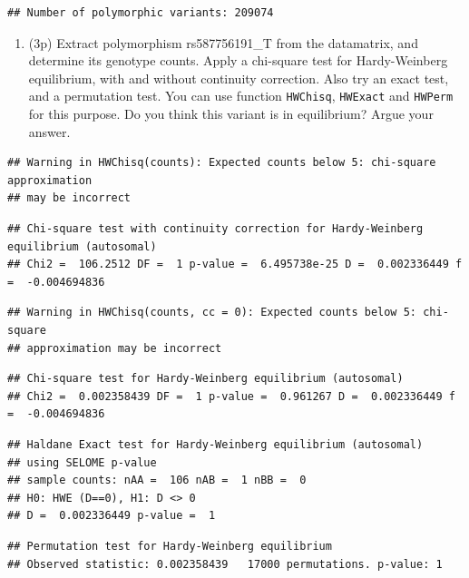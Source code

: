 \documentclass[
]{article}
\providecommand{\tightlist}{%
  \setlength{\itemsep}{0pt}\setlength{\parskip}{0pt}}
\begin{document}
\begin{verbatim}
## Number of polymorphic variants: 209074
\end{verbatim}

\begin{enumerate}
\def\labelenumi{\arabic{enumi}.}
\setcounter{enumi}{2}
\tightlist
\item
  (3p) Extract polymorphism rs587756191\_T from the datamatrix, and
  determine its genotype counts. Apply a chi-square test for
  Hardy-Weinberg equilibrium, with and without continuity correction.
  Also try an exact test, and a permutation test. You can use function
  \texttt{HWChisq}, \texttt{HWExact} and \texttt{HWPerm} for this
  purpose. Do you think this variant is in equilibrium? Argue your
  answer.
\end{enumerate}

\begin{verbatim}
## Warning in HWChisq(counts): Expected counts below 5: chi-square approximation
## may be incorrect
\end{verbatim}

\begin{verbatim}
## Chi-square test with continuity correction for Hardy-Weinberg equilibrium (autosomal)
## Chi2 =  106.2512 DF =  1 p-value =  6.495738e-25 D =  0.002336449 f =  -0.004694836
\end{verbatim}

\begin{verbatim}
## Warning in HWChisq(counts, cc = 0): Expected counts below 5: chi-square
## approximation may be incorrect
\end{verbatim}

\begin{verbatim}
## Chi-square test for Hardy-Weinberg equilibrium (autosomal)
## Chi2 =  0.002358439 DF =  1 p-value =  0.961267 D =  0.002336449 f =  -0.004694836
\end{verbatim}

\begin{verbatim}
## Haldane Exact test for Hardy-Weinberg equilibrium (autosomal)
## using SELOME p-value
## sample counts: nAA =  106 nAB =  1 nBB =  0 
## H0: HWE (D==0), H1: D <> 0 
## D =  0.002336449 p-value =  1
\end{verbatim}

\begin{verbatim}
## Permutation test for Hardy-Weinberg equilibrium
## Observed statistic: 0.002358439   17000 permutations. p-value: 1
\end{verbatim}
\end{document}
